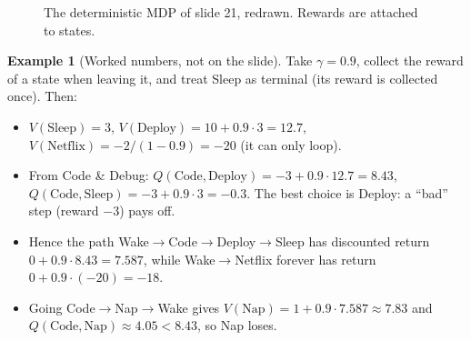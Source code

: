 \documentclass[11pt,a4paper]{article}
\theoremstyle{plain}
\theoremstyle{definition}
\newtheorem{example}[theorem]{Example}
\theoremstyle{remark}
\begin{document}
\begin{figure}[htbp]
\centering
{}
\caption{The deterministic MDP of slide 21, redrawn. Rewards are attached to states.}
\end{figure}

\begin{example}[Worked numbers, not on the slide]
Take $\gamma=0.9$, collect the reward of a state when leaving it, and treat Sleep as terminal (its reward is collected once). Then:
\begin{itemize}[nosep]
 \item $V(\text{Sleep})=3$, $V(\text{Deploy})=10+0.9\cdot3=12.7$, $V(\text{Netflix})=-2/(1-0.9)=-20$ (it can only loop).
 \item From Code \& Debug: $Q(\text{Code},\text{Deploy})=-3+0.9\cdot12.7=8.43$, $Q(\text{Code},\text{Sleep})=-3+0.9\cdot3=-0.3$. The best choice is Deploy: a ``bad'' step (reward $-3$) pays off.
 \item Hence the path Wake$\to$Code$\to$Deploy$\to$Sleep has discounted return $0+0.9\cdot8.43=7.587$, while Wake$\to$Netflix forever has return $0+0.9\cdot(-20)=-18$.
 \item Going Code$\to$Nap$\to$Wake gives $V(\text{Nap})=1+0.9\cdot7.587\approx7.83$ and $Q(\text{Code},\text{Nap})\approx4.05<8.43$, so Nap loses.
\end{itemize}
\end{example}
\end{document}
